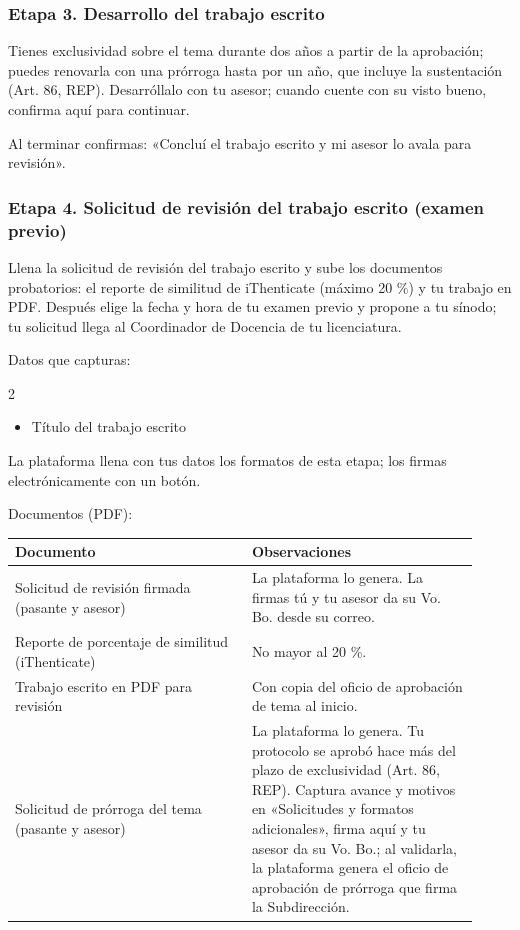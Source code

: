 \subsubsection*{Etapa 3. Desarrollo del trabajo escrito}
Tienes exclusividad sobre el tema durante dos años a partir de la aprobación; puedes renovarla con una prórroga hasta por un año, que incluye la sustentación (Art. 86, REP). Desarróllalo con tu asesor; cuando cuente con su visto bueno, confirma aquí para continuar.

Al terminar confirmas: «Concluí el trabajo escrito y mi asesor lo avala para revisión».
\subsubsection*{Etapa 4. Solicitud de revisión del trabajo escrito (examen previo)}
Llena la solicitud de revisión del trabajo escrito y sube los documentos probatorios: el reporte de similitud de iThenticate (máximo 20 \%) y tu trabajo en PDF. Después elige la fecha y hora de tu examen previo y propone a tu sínodo; tu solicitud llega al Coordinador de Docencia de tu licenciatura.

Datos que capturas:
\begin{multicols}{2}\small
\begin{itemize}
  \item Título del trabajo escrito
\end{itemize}
\end{multicols}

La plataforma llena con tus datos los formatos de esta etapa; los firmas electrónicamente con un botón.

Documentos (PDF):
{\small\begin{longtable}{>{\raggedright\arraybackslash}p{0.47\linewidth}>{\raggedright\arraybackslash}p{0.45\linewidth}}
\toprule
\textbf{Documento} & \textbf{Observaciones}\\
\midrule
\endhead
Solicitud de revisión firmada (pasante y asesor) & La plataforma lo genera. La firmas tú y tu asesor da su Vo. Bo. desde su correo.\\
Reporte de porcentaje de similitud (iThenticate) & No mayor al 20 \%.\\
Trabajo escrito en PDF para revisión & Con copia del oficio de aprobación de tema al inicio.\\
Solicitud de prórroga del tema (pasante y asesor) & La plataforma lo genera. Tu protocolo se aprobó hace más del plazo de exclusividad (Art. 86, REP). Captura avance y motivos en «Solicitudes y formatos adicionales», firma aquí y tu asesor da su Vo. Bo.; al validarla, la plataforma genera el oficio de aprobación de prórroga que firma la Subdirección.\\
\bottomrule
\end{longtable}}

